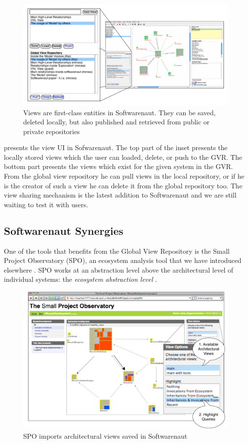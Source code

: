 \documentclass[preprint,12pt]{elsarticle}
\begin{document}
\begin{figure}[h]
\begin{center}
\includegraphics[width=\linewidth]{ViewOperations}
\caption{Views are first-class entities in Softwarenaut. They can be saved, deleted locally, but also published and retrieved from public or private repositories}
\end{center}
\end{figure}

 presents the view UI in Sofwarenaut. The top part of the inset presents the locally stored views which the user can loaded, delete, or push to the GVR. The bottom part presents the views which exist for the given system in the GVR. From the global view repository he can pull views in the local repository, or if he is the creator of such a view he can delete it from the global repository too. The view sharing mechanism is the latest addition to Softwarenaut and we are still waiting to test it with users. 


\subsection {Softwarenaut Synergies}
One of the tools that benefits from the Global View Repository is the Small Project Observatory (SPO), an ecosystem analysis tool that we have introduced elsewhere \cite{lungu-est}. SPO works at an abstraction level above the architectural level of individual systems: the {\em ecosystem abstraction level} \cite{lungu-thesis}. 

\begin{figure}[th!]
\begin{center}
\includegraphics[width=0.7\linewidth]{SpoArchitectural}
\caption{SPO imports architectural views saved in Softwarenaut}
\label{}
\end{center}
\end{figure}
\end{document}
